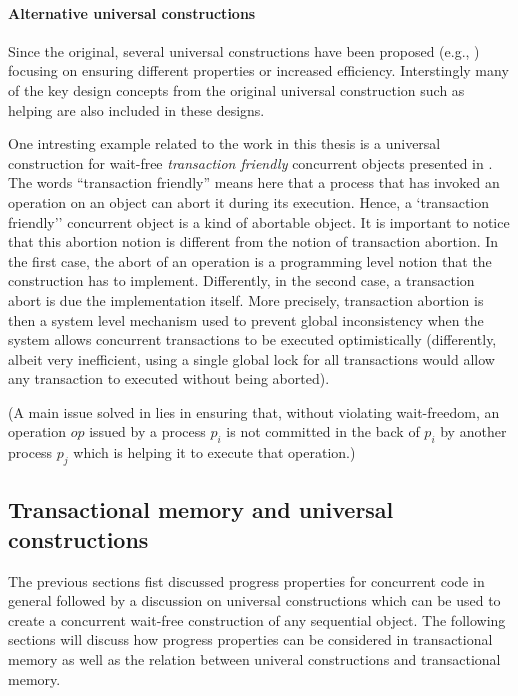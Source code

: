 \paragraph{Alternative universal constructions}
Since the original, several  universal constructions have been proposed
(e.g., \cite{ADT95,AM99,FK09}) focusing on ensuring different properties
or increased efficiency.
Interstingly many of the key design concepts from the original universal construction
such as helping are also included in these designs.

One intresting example related to the work in this thesis is
a universal construction for wait-free {\it transaction friendly} 
concurrent objects presented in \cite{CER10}. The words 
``transaction friendly'' means here that a process that has invoked an
operation on an object can abort it during its execution. Hence, 
a `transaction friendly'' concurrent object is a kind of  
abortable object.  It is important to notice  that  this  abortion 
notion is different from  the notion of  transaction abortion. 
In the first case, the abort of an operation is a programming level notion
that  the construction has to implement. 
Differently, in the second case,  a transaction abort is  due 
the implementation itself. More precisely, 
transaction abortion is then a system level mechanism used to  prevent  
global inconsistency when  the system allows concurrent transactions 
to be  executed
optimistically (differently, albeit very inefficient,  using a single 
global lock for  all transactions would allow any  transaction to executed
without being aborted).

(A main issue solved in  \cite{CER10}
lies in ensuring that, without violating wait-freedom,  an  operation $op$ 
issued by a process $p_i$  is not committed in the back of $p_i$ by another  
process $p_j$  which is  helping it to execute that  operation.) 


\subsection{Transactional memory and universal constructions}
The previous sections fist discussed progress properties for
concurrent code in general followed by a discussion
on universal constructions which can be used to create
a concurrent wait-free construction of any sequential object.
The following sections will discuss how progress properties
can be considered in transactional memory as well as the relation
between univeral constructions and transactional memory.




